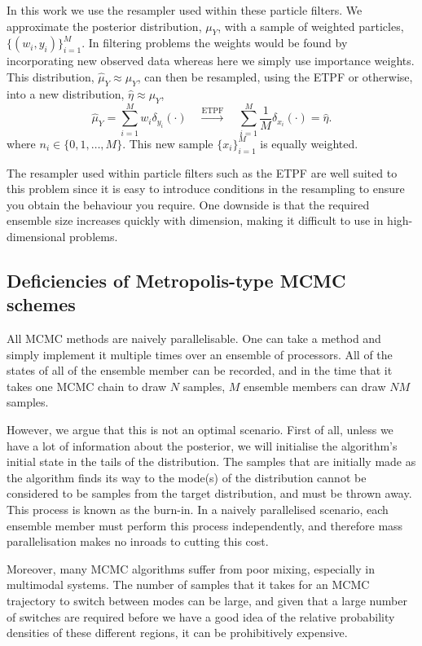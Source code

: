 \documentclass[final]{siamltex}
\begin{document}
In this work we use the resampler used within these particle filters. We
approximate the posterior distribution, $\mu_Y$, with a sample
of weighted particles, $\{(w_i,y_i)\}_{i=1}^M$. In filtering problems
the weights would be found by incorporating new observed data whereas
here we simply use importance weights. This distribution, $\hat{\mu}_Y
\approx \mu_Y$, can then be resampled, using the ETPF or otherwise,
into a new distribution, $\hat{\eta} \approx \mu_Y$,
\begin{equation}\label{eqn:resampler}
	\hat{\mu}_Y = \sum\limits_{i=1}^M \! w_i\delta_{y_i}(\cdot)
	 \quad \xrightarrow{\text{ETPF}} \quad \sum\limits_{i=1}^M \!
	 \frac{1}{M} \delta_{x_i}(\cdot) = \hat{\eta}.
\end{equation}
where $n_i \in \{0, 1, \dots,M\}$. This
new sample $\{x_i\}_{i=1}^M$ is equally weighted.

The resampler used within particle filters such as the ETPF are well suited to this problem
since it is easy to introduce conditions in the resampling to ensure
you obtain the behaviour you require. One downside is that the
required ensemble size increases quickly with dimension, making it
difficult to use in high-dimensional problems.


\subsection{Deficiencies of Metropolis-type MCMC schemes}
All MCMC methods are naively parallelisable. One can take a method
and simply implement it multiple times over an ensemble of processors. All
of the states of all of the ensemble member can be recorded, and in the time
that it takes one MCMC chain to draw $N$ samples, $M$ ensemble members
can draw $NM$ samples. 

However, we argue that this is not an optimal
scenario. First of all, unless we have a lot of information about the
posterior, we will initialise the algorithm's initial state in the
tails of the distribution. The samples that are initially made as the
algorithm finds its way to the mode(s) of the distribution cannot be
considered to be samples from the target distribution, and must be thrown
away. This process is known as the burn-in. In a naively parallelised
scenario, each ensemble member must perform this process independently,
and therefore mass parallelisation makes no inroads to cutting this cost.

Moreover, many MCMC algorithms suffer from poor mixing, especially in
multimodal systems. The number of samples that it takes for an MCMC
trajectory to switch between modes can be large, and given that a large
number of switches are required before we have a good idea of the relative
probability densities of these different regions, it can be prohibitively
expensive.
\end{document}
